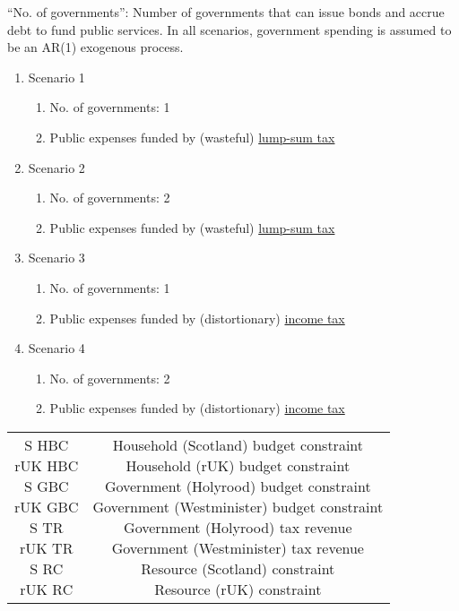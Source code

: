 ``No. of governments'': Number of governments that can issue bonds and accrue debt to fund public services. In all scenarios, government spending is assumed to be an AR(1) exogenous process.
\begin{enumerate}
    \item Scenario 1
    \begin{enumerate}
        \item No. of governments: 1
        \item Public expenses funded by (wasteful) \underline{lump-sum tax}
    \end{enumerate}
    \item Scenario 2
    \begin{enumerate}
        \item No. of governments: 2
        \item Public expenses funded by (wasteful) \underline{lump-sum tax}
    \end{enumerate}
    \item Scenario 3
    \begin{enumerate}
        \item No. of governments: 1
        \item Public expenses funded by (distortionary) \underline{income tax}
    \end{enumerate}
    \item Scenario 4
    \begin{enumerate}
        \item No. of governments: 2
        \item Public expenses funded by (distortionary) \underline{income tax}
    \end{enumerate}
\end{enumerate}
\pagebreak
\begin{table}[H]
    \centering
    \begin{tabular}{c|c}
        \makecell{
            S HBC \\
            rUK HBC \\
            S GBC \\
            rUK GBC \\
            S TR \\
            rUK TR \\
            S RC \\
            rUK RC \\
        } & 
        \makecell{
            Household (Scotland) budget constraint \\
            Household (rUK) budget constraint \\
            Government (Holyrood) budget constraint \\
            Government (Westminister) budget constraint \\
            Government (Holyrood) tax revenue \\
            Government (Westminister) tax revenue \\
            Resource (Scotland) constraint \\
            Resource (rUK) constraint \\
        }
    \end{tabular}
\end{table}
